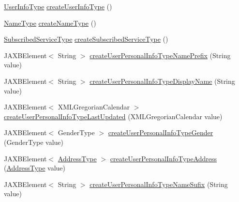 \begin{DoxyCompactItemize}
\item 
\hyperlink{classcom_1_1telefonica_1_1schemas_1_1unica_1_1rest_1_1directory_1_1v1_1_1UserInfoType}{UserInfoType} \hyperlink{classcom_1_1telefonica_1_1schemas_1_1unica_1_1rest_1_1directory_1_1v1_1_1ObjectFactory_ab12dafa50d383d6ed518159b598ea297}{createUserInfoType} ()
\item 
\hyperlink{classcom_1_1telefonica_1_1schemas_1_1unica_1_1rest_1_1directory_1_1v1_1_1NameType}{NameType} \hyperlink{classcom_1_1telefonica_1_1schemas_1_1unica_1_1rest_1_1directory_1_1v1_1_1ObjectFactory_a3fd77d718de5663c808c07fec29399ea}{createNameType} ()
\item 
\hyperlink{classcom_1_1telefonica_1_1schemas_1_1unica_1_1rest_1_1directory_1_1v1_1_1SubscribedServiceType}{SubscribedServiceType} \hyperlink{classcom_1_1telefonica_1_1schemas_1_1unica_1_1rest_1_1directory_1_1v1_1_1ObjectFactory_a0ec12d1fd452b70a3b709a3a249db57c}{createSubscribedServiceType} ()
\item 
JAXBElement$<$ String $>$ \hyperlink{classcom_1_1telefonica_1_1schemas_1_1unica_1_1rest_1_1directory_1_1v1_1_1ObjectFactory_ac9c5f5255cef2ab4a5c8bf0d5661386b}{createUserPersonalInfoTypeNamePrefix} (String value)
\item 
JAXBElement$<$ String $>$ \hyperlink{classcom_1_1telefonica_1_1schemas_1_1unica_1_1rest_1_1directory_1_1v1_1_1ObjectFactory_ad47c430d0bf1f05df17fdb3c6619096e}{createUserPersonalInfoTypeDisplayName} (String value)
\item 
JAXBElement$<$ XMLGregorianCalendar $>$ \hyperlink{classcom_1_1telefonica_1_1schemas_1_1unica_1_1rest_1_1directory_1_1v1_1_1ObjectFactory_a34584434e5d0abb2611133d18d7a4c1d}{createUserPersonalInfoTypeLastUpdated} (XMLGregorianCalendar value)
\item 
JAXBElement$<$ GenderType $>$ \hyperlink{classcom_1_1telefonica_1_1schemas_1_1unica_1_1rest_1_1directory_1_1v1_1_1ObjectFactory_a150fc5bda2bcd22b52b43317d9f536e4}{createUserPersonalInfoTypeGender} (GenderType value)
\item 
JAXBElement$<$ \hyperlink{classcom_1_1telefonica_1_1schemas_1_1unica_1_1rest_1_1common_1_1v1_1_1AddressType}{AddressType} $>$ \hyperlink{classcom_1_1telefonica_1_1schemas_1_1unica_1_1rest_1_1directory_1_1v1_1_1ObjectFactory_ae234771e790aff6eb519a1d27f34d619}{createUserPersonalInfoTypeAddress} (\hyperlink{classcom_1_1telefonica_1_1schemas_1_1unica_1_1rest_1_1common_1_1v1_1_1AddressType}{AddressType} value)
\item 
JAXBElement$<$ String $>$ \hyperlink{classcom_1_1telefonica_1_1schemas_1_1unica_1_1rest_1_1directory_1_1v1_1_1ObjectFactory_a23b7c718cd328a276f7ead22d1d7a5f8}{createUserPersonalInfoTypeNameSufix} (String value)

\end{DoxyCompactItemize}
